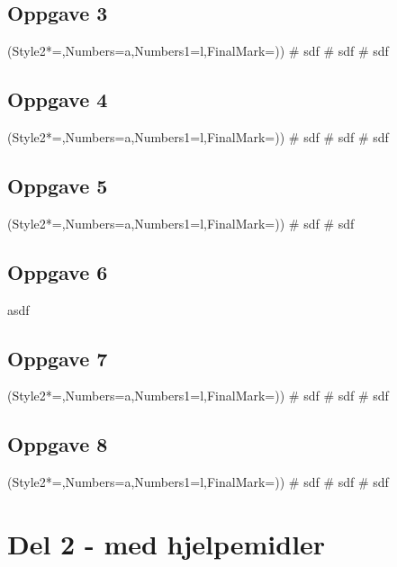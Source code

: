 \subsection*{Oppgave 3}
\begin{easylist}[enumerate]
	\ListProperties(Style2*=,Numbers=a,Numbers1=l,FinalMark={)})
	# sdf
	# sdf
	# sdf
\end{easylist}


\subsection*{Oppgave 4}
\begin{easylist}[enumerate]
	\ListProperties(Style2*=,Numbers=a,Numbers1=l,FinalMark={)})
	# sdf
	# sdf
	# sdf
\end{easylist}


\subsection*{Oppgave 5}
\begin{easylist}[enumerate]
	\ListProperties(Style2*=,Numbers=a,Numbers1=l,FinalMark={)})
	# sdf
	# sdf
\end{easylist}


\subsection*{Oppgave 6}
asdf


\subsection*{Oppgave 7}
\begin{easylist}[enumerate]
	\ListProperties(Style2*=,Numbers=a,Numbers1=l,FinalMark={)})
	# sdf
	# sdf
	# sdf
\end{easylist}


\subsection*{Oppgave 8}
\begin{easylist}[enumerate]
	\ListProperties(Style2*=,Numbers=a,Numbers1=l,FinalMark={)})
	# sdf
	# sdf
	# sdf
\end{easylist}







\clearpage 
\section*{Del 2 - med hjelpemidler}


